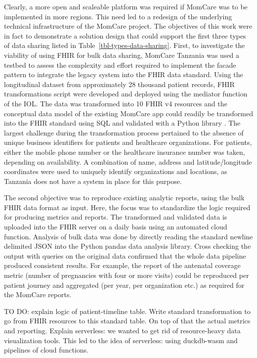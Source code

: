 \documentclass[
  authoryear]{elsarticle}
\begin{document}
Clearly, a more open and scaleable platform was required if MomCare was
to be implemented in more regions. This need led to a redesign of the
underlying technical infrastructure of the MomCare project. The
objectives of this work were in fact to demonstrate a solution design
that could support the first three types of data sharing listed in
Table~\ref{tbl-types-data-sharing}. First, to investigate the viability
of using FHIR for bulk data sharing, MomCare Tanzania was used a testbed
to assess the complexity and effort required to implement the facade
pattern to integrate the legacy system into the FHIR data standard.
Using the longitudinal dataset from approximately 28 thousand patient
records, FHIR transformations script were developed and deployed using
the mediator function of the IOL. The data was transformed into 10 FHIR
v4 resources and the conceptual data model of the existing MomCare app
could readily be transformed into the FHIR standard using SQL and
validated with a Python library \citep{islam2023fhir}. The largest
challenge during the transformation process pertained to the absence of
unique business identifiers for patients and healthcare organizations.
For patients, either the mobile phone number or the healthcare insurance
number was taken, depending on availability. A combination of name,
address and latitude/longitude coordinates were used to uniquely
identify organizations and locations, as Tanzania does not have a system
in place for this purpose.

The second objective was to reproduce existing analytic reports, using
the bulk FHIR data format as input. Here, the focus was to standardize
the logic required for producing metrics and reports. The transformed
and validated data is uploaded into the FHIR server on a daily basis
using an automated cloud function. Analysis of bulk data was done by
directly reading the standard newline delimited JSON into the Python
pandas data analysis library. Cross checking the output with queries on
the original data confirmed that the whole data pipeline produced
consistent results. For example, the report of the antenatal coverage
metric (number of pregnancies with four or more visits) could be
reproduced per patient journey and aggregated (per year, per
organization etc.) as required for the MomCare reports.

TO DO: explain logic of patient-timeline table. Write standard
transformation to go from FHIR resources to this standard table. On top
of that the actual metrics and reporting. Explain serverless: we wanted
to get rid of resource-heavy data visualization tools. This led to the
idea of serverless: using duckdb-wasm and pipelines of cloud functions.
\end{document}
